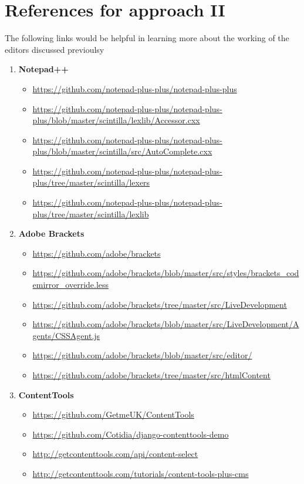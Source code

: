 \section{References for approach II}
The following links would be helpful in learning more about the working of the editors discussed previoulsy
\begin{enumerate}
\item\textbf{Notepad++}
\begin{itemize}
\item \url{https://github.com/notepad-plus-plus/notepad-plus-plus}
\item \url{https://github.com/notepad-plus-plus/notepad-plus-plus/blob/master/scintilla/lexlib/Accessor.cxx}
\item \url{https://github.com/notepad-plus-plus/notepad-plus-plus/blob/master/scintilla/src/AutoComplete.cxx}
\item \url{https://github.com/notepad-plus-plus/notepad-plus-plus/tree/master/scintilla/lexers}
\item \url{https://github.com/notepad-plus-plus/notepad-plus-plus/tree/master/scintilla/lexlib}
\end{itemize}
\item\textbf{Adobe Brackets}
\begin{itemize}
\item \url{https://github.com/adobe/brackets}
\item \url{https://github.com/adobe/brackets/blob/master/src/styles/brackets_codemirror_override.less}
\item \url{https://github.com/adobe/brackets/tree/master/src/LiveDevelopment}
\item \url{https://github.com/adobe/brackets/blob/master/src/LiveDevelopment/Agents/CSSAgent.js}
\item \url{https://github.com/adobe/brackets/blob/master/src/editor/}
\item \url{https://github.com/adobe/brackets/tree/master/src/htmlContent}
\end{itemize}
\item\textbf{ContentTools}
\begin{itemize}
\item \url{https://github.com/GetmeUK/ContentTools}
\item \url{https://github.com/Cotidia/django-contenttools-demo}
\item \url{http://getcontenttools.com/api/content-select}
\item \url{http://getcontenttools.com/tutorials/content-tools-plus-cms}
\end{itemize}
\end{enumerate}


